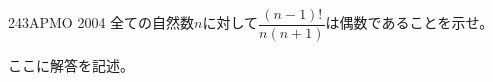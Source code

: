 \begin{thm}{243}{}{APMO 2004}
 全ての自然数$n$に対して$\dfrac{(n-1)!}{n(n+1)}$は偶数であることを示せ。\\
\end{thm}

ここに解答を記述。
